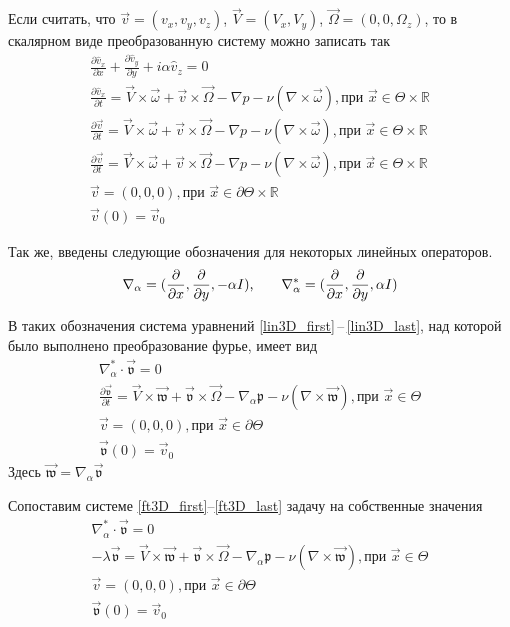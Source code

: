 Если считать, что $\vec v = (v_x, v_y, v_z)$, $\vec V = (V_x, V_y)$, $\vec \Omega = (0, 0, \Omega_z)$, то в скалярном виде преобразованную систему можно записать так
\begin{gather} 
  \label{scalar3D_first}
 \frac{\partial \hat v_x}{\partial x} + \frac{\partial \hat v_y}{\partial y} + i\alpha \hat v_z= 0\\
% 
 \frac{\partial \hat v_x}{\partial t} = \vec V \times \vec \omega + \vec v \times \vec \Omega - \nabla p - \nu ( \nabla \times \vec \omega ), \text{при } \vec x \in \Theta \times \mathbb{R}\\
% 
 \frac{\partial \vec v}{\partial t} = \vec V \times \vec \omega + \vec v \times \vec \Omega - \nabla p - \nu ( \nabla \times \vec \omega ), \text{при } \vec x \in \Theta \times \mathbb{R}\\
% 
 \frac{\partial \vec v}{\partial t} = \vec V \times \vec \omega + \vec v \times \vec \Omega - \nabla p - \nu ( \nabla \times \vec \omega ), \text{при } \vec x \in \Theta \times \mathbb{R}\\
% 
 \vec v = (0,0,0), \text{при } \vec x \in \partial \Theta \times \mathbb{R} \\
 \vec v (0) = \vec v _0 
  \label{scalar3D_last}
\end{gather}
\fi

Так же, введены следующие обозначения для некоторых линейных операторов.
$$
  \nabla_\alpha = (\frac{\partial}{\partial x},\frac{\partial}{\partial y},-\alpha I)\text{,\qquad} 
  \nabla_\alpha^* = (\frac{\partial}{\partial x},\frac{\partial}{\partial y},\alpha I) 
$$

В таких обозначения система уравнений \ref{lin3D_first}\,--\,\ref{lin3D_last}, над которой было выполнено преобразование фурье, имеет вид
\begin{gather} 
  \label{ft3D_first}
  \nabla_\alpha^* \cdot  \mathfrak{\vec v} = 0\\
  \frac{\partial \mathfrak{\vec v}}{\partial t} = \vec V \times \mathfrak{\vec w} + \mathfrak{\vec v} \times \vec \Omega - 
		\nabla_\alpha \mathfrak{p} - \nu ( \nabla \times \mathfrak{\vec w} ), \text{при } \vec x \in \Theta\\
  \vec v = (0,0,0), \text{при } \vec x \in \partial \Theta\\
  \mathfrak{\vec v} (0) = \vec v _0 \label{ft3D_last}
\end{gather}
Здесь $\mathfrak{\vec w} = \nabla_\alpha \mathfrak{\vec v}$ 

Сопоставим системе \ref{ft3D_first}--\ref{ft3D_last} задачу на собственные значения
\begin{gather} 
  \label{s3D_first}
  \nabla_\alpha^* \cdot  \mathfrak{\vec v} = 0\\
  - \lambda \mathfrak{\vec v} = \vec V \times \mathfrak{\vec w} + \mathfrak{\vec v} \times \vec \Omega - 
		\nabla_\alpha \mathfrak{p} - \nu ( \nabla \times \mathfrak{\vec w} ), \text{при } \vec x \in \Theta\\
  \vec v = (0,0,0), \text{при } \vec x \in \partial \Theta\\
  \mathfrak{\vec v} (0) = \vec v _0 \label{s3D_last}
\end{gather}

